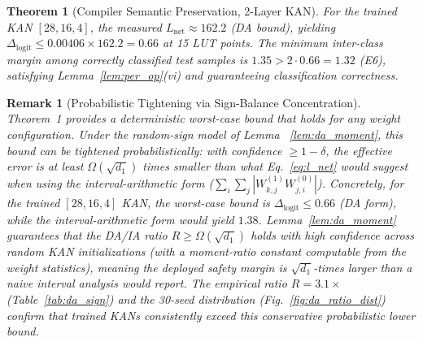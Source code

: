 \documentclass[journal,onecolumn]{IEEEtran}
\newtheorem{theorem}{Theorem}
\newtheorem{remark}{Remark}
\begin{document}
\begin{theorem}[Compiler Semantic Preservation, 2-Layer KAN]
For the trained KAN $[28,16,4]$, the measured $L_{\text{net}} \approx
162.2$ (DA bound), yielding $\Delta_{\text{logit}} \leq 0.00406 \times
162.2 = 0.66$ at 15 LUT points. The minimum inter-class margin among
correctly classified test samples is $1.35 > 2 \cdot 0.66 = 1.32$ (E6),
satisfying Lemma~\ref{lem:per_op}(vi) and guaranteeing classification correctness.
\end{theorem}

\begin{remark}[Probabilistic Tightening via Sign-Balance Concentration]
\label{rem:prob_tightening}
Theorem~1 provides a deterministic worst-case bound that holds for
\textit{any} weight configuration. Under the random-sign model of
Lemma~
\ref{lem:da_moment}, this bound can be tightened probabilistically: with
confidence $\geq 1-\delta$, the effective error is at least
$\Omega(\sqrt{d_1})$ times smaller than what Eq.~\eqref{eq:l_net}
would suggest when using the interval-arithmetic form ($\sum_i \sum_j
|W^{(1)}_{k,j}W^{(0)}_{j,i}|$). Concretely, for the trained
$[28,16,4]$ KAN, the worst-case bound is $\Delta_{\text{logit}} \leq
0.66$ (DA form), while the interval-arithmetic form would yield
$1.38$. Lemma~\ref{lem:da_moment} guarantees that the DA/IA ratio
$R \geq \Omega(\sqrt{d_1})$ holds with high confidence across random
KAN initializations (with a moment-ratio constant computable from the
weight statistics), meaning the deployed safety margin is
$\sqrt{d_1}$-times larger than a naive interval analysis would report.
The empirical ratio $R = 3.1\times$ (Table~\ref{tab:da_sign}) and the
30-seed distribution (Fig.~\ref{fig:da_ratio_dist}) confirm that
trained KANs consistently exceed this conservative probabilistic
lower bound.
\end{remark}
\end{document}
